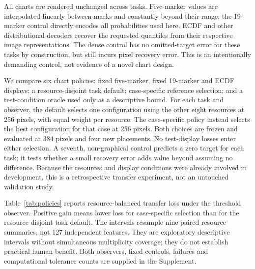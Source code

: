 \documentclass[11pt]{article}
\begin{document}
All charts are rendered unchanged across tasks. Five-marker values are interpolated linearly between marks and constantly beyond their range; the 19-marker control directly encodes all probabilities used here. ECDF and other distributional decoders recover the requested quantiles from their respective image representations. The dense control has no omitted-target error for these tasks by construction, but still incurs pixel recovery error. This is an intentionally demanding control, not evidence of a novel chart design.

We compare six chart policies: fixed five-marker, fixed 19-marker and ECDF displays; a resource-disjoint task default; case-specific reference selection; and a test-condition oracle used only as a descriptive bound. For each task and observer, the default selects one configuration using the other eight resources at 256 pixels, with equal weight per resource. The case-specific policy instead selects the best configuration for that case at 256 pixels. Both choices are frozen and evaluated at 384 pixels and four new placements. No test-display losses enter either selection. A seventh, non-graphical control predicts a zero target for each task; it tests whether a small recovery error adds value beyond assuming no difference. Because the resources and display conditions were already involved in development, this is a retrospective transfer experiment, not an untouched validation study.

Table~\ref{tab:policies} reports resource-balanced transfer loss under the threshold observer. Positive gain means lower loss for case-specific selection than for the resource-disjoint task default. The intervals resample nine paired resource summaries, not 127 independent features. They are exploratory descriptive intervals without simultaneous multiplicity coverage; they do not establish practical human benefit. Both observers, fixed controls, failures and computational tolerance counts are supplied in the Supplement.

\begin{table}[ht]\centering\scriptsize
\caption{\textbf{Does case-specific selection improve on a task default at a new display condition?} Each resource has equal weight. Q19 is the fixed 19-marker control. Gain is default loss minus case-selection loss; negative values favor the simpler default. Intervals use 5,000 paired resource bootstrap resamples. All losses are in pooled-SD units.}\label{tab:policies}

\end{table}
\end{document}

